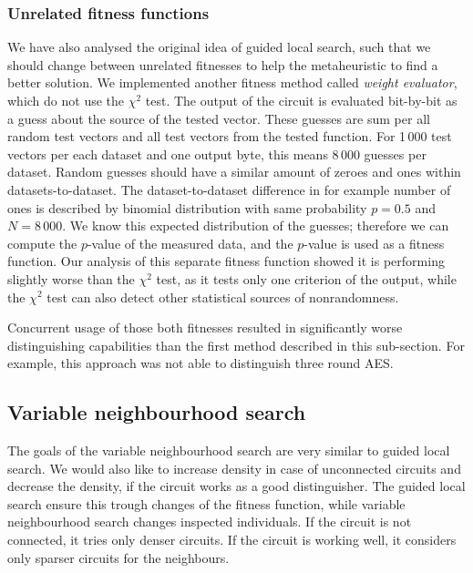 \documentclass[
  print, %
  Table,   %
  nolof,     %
  nolot,     %
  11pt, %
  oneside  %
]{fithesis3}
\begin{document}
\subsubsection{\textbf{Unrelated fitness functions}}

We have also analysed the original idea of guided local search, such that we should change between unrelated fitnesses to help the metaheuristic to find a better solution. We implemented another fitness method called \textit{weight evaluator}, which do not use the $\chi^{2}$ test. The output of the circuit is evaluated bit-by-bit as a guess about the source of the tested vector. These guesses are sum per all random test vectors and all test vectors from the tested function. For 1\,000 test vectors per each dataset and one output byte, this means 8\,000 guesses per dataset. Random guesses should have a similar amount of zeroes and ones within datasets-to-dataset. The dataset-to-dataset difference in for example number of ones is described by binomial distribution with same probability $p = 0.5$ and $N = 8\,000$. We know this expected distribution of the guesses; therefore we can compute the $p$-value of the measured data, and the $p$-value is used as a fitness function. Our analysis of this separate fitness function showed it is performing slightly worse than the $\chi^{2}$ test, as it tests only one criterion of the output, while the $\chi^{2}$ test can also detect other statistical sources of nonrandomness.

Concurrent usage of those both fitnesses resulted in significantly worse distinguishing capabilities than the first method described in this sub-section. For example, this approach was not able to distinguish three round AES.


\subsection{Variable neighbourhood search}
\label{subsec:res-ss-vns}

The goals of the variable neighbourhood search are very similar to guided local search. We would also like to increase density in case of unconnected circuits and decrease the density, if the circuit works as a good distinguisher. The guided local search ensure this trough changes of the fitness function, while variable neighbourhood search changes inspected individuals. If the circuit is not connected, it tries only denser circuits. If the circuit is working well, it considers only sparser circuits for the neighbours.
\end{document}
